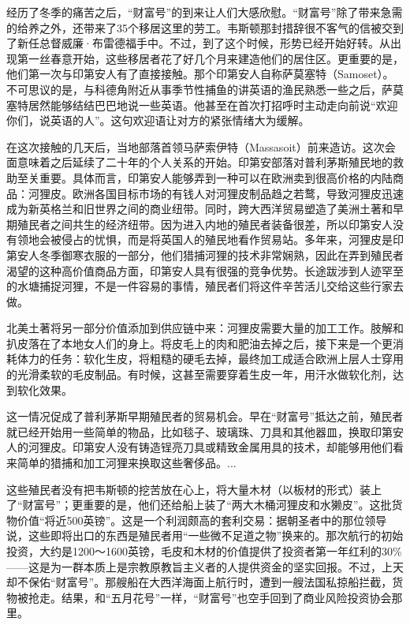 \documentclass[12pt,oneside]{book}
\begin{document}
\begin{bookref}[frametitle={\cite{美国四百年}}]
经历了冬季的痛苦之后，“财富号”的到来让人们大感欣慰。“财富号”除了带来急需的给养之外，还带来了35个移居这里的劳工。韦斯顿那封措辞很不客气的信被交到了新任总督威廉·布雷德福手中。不过，到了这个时候，形势已经开始好转。从出现第一丝春意开始，这些移居者花了好几个月来建造他们的居住区。更重要的是，他们第一次与印第安人有了直接接触。那个印第安人自称萨莫塞特（Samoset）。不可思议的是，与科德角附近从事季节性捕鱼的讲英语的渔民熟悉一些之后，萨莫塞特居然能够结结巴巴地说一些英语。他甚至在首次打招呼时主动走向前说“欢迎你们，说英语的人”。这句欢迎语让对方的紧张情绪大为缓解。

在这次接触的几天后，当地部落首领马萨索伊特（Massasoit）前来造访。这次会面意味着之后延续了二十年的个人关系的开始。印第安部落对普利茅斯殖民地的救助至关重要。具体而言，印第安人能够弄到一种可以在欧洲卖到很高价格的内陆商品：河狸皮。欧洲各国目标市场的有钱人对河狸皮制品趋之若鹜，导致河狸皮迅速成为新英格兰和旧世界之间的商业纽带。同时，跨大西洋贸易塑造了美洲土著和早期殖民者之间共生的经济纽带。因为进入内地的殖民者装备很差，所以印第安人没有领地会被侵占的忧惧，而是将英国人的殖民地看作贸易站。多年来，河狸皮是印第安人冬季御寒衣服的一部分，他们猎捕河狸的技术非常娴熟，因此在弄到殖民者渴望的这种高价值商品方面，印第安人具有很强的竞争优势。长途跋涉到人迹罕至的水塘捕捉河狸，不是一件容易的事情，殖民者们将这件辛苦活儿交给这些行家去做。

北美土著将另一部分价值添加到供应链中来：河狸皮需要大量的加工工作。肢解和扒皮落在了本地女人们的身上。将皮毛上的肉和肥油去掉之后，接下来是一个更消耗体力的任务：软化生皮，将粗糙的硬毛去掉，最终加工成适合欧洲上层人士穿用的光滑柔软的毛皮制品。有时候，这甚至需要穿着生皮一年，用汗水做软化剂，达到软化效果。

这一情况促成了普利茅斯早期殖民者的贸易机会。早在“财富号”抵达之前，殖民者就已经开始用一些简单的物品，比如毯子、玻璃珠、刀具和其他器皿，换取印第安人的河狸皮。印第安人没有铸造锃亮刀具或精致金属用具的技术，却能够用他们看来简单的猎捕和加工河狸来换取这些奢侈品。...

这些殖民者没有把韦斯顿的挖苦放在心上，将大量木材（以板材的形式）装上了“财富号”；更重要的是，他们还给船上装了“两大木桶河狸皮和水獭皮”。这批货物价值“将近500英镑”。这是一个利润颇高的套利交易：据朝圣者中的那位领导说，这些即将出口的东西是殖民者用“一些微不足道之物”换来的。那次航行的初始投资，大约是1200～1600英镑，毛皮和木材的价值提供了投资者第一年红利的30\%——这是为一群本质上是宗教原教旨主义者的人提供资金的坚实回报。不过，上天却不保佑“财富号”。那艘船在大西洋海面上航行时，遭到一艘法国私掠船拦截，货物被抢走。结果，和“五月花号”一样，“财富号”也空手回到了商业风险投资协会那里。


\end{bookref}
\end{document}
